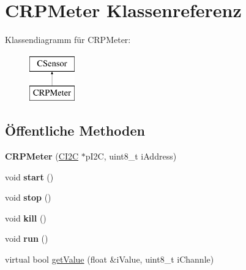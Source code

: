 \hypertarget{class_c_r_p_meter}{\section{\-C\-R\-P\-Meter \-Klassenreferenz}
\label{class_c_r_p_meter}
}
\-Klassendiagramm für \-C\-R\-P\-Meter\-:\begin{figure}[H]
\begin{center}
\leavevmode
\includegraphics[height=2.000000cm]{class_c_r_p_meter}
\end{center}
\end{figure}
\subsection*{Öffentliche \-Methoden}
\begin{DoxyCompactItemize}
\item 
\hypertarget{class_c_r_p_meter_ab0ce8f26cfa08edfe5f8b0810591eaca}{{\bfseries \-C\-R\-P\-Meter} (\hyperlink{class_c_i2_c}{\-C\-I2\-C} $\ast$p\-I2\-C, uint8\-\_\-t i\-Address)}\label{class_c_r_p_meter_ab0ce8f26cfa08edfe5f8b0810591eaca}

\item 
\hypertarget{class_c_r_p_meter_ae777168160c21ca61fcc2070bd691ef6}{void {\bfseries start} ()}\label{class_c_r_p_meter_ae777168160c21ca61fcc2070bd691ef6}

\item 
\hypertarget{class_c_r_p_meter_a2af8f07faa15457ab5440eed411065e5}{void {\bfseries stop} ()}\label{class_c_r_p_meter_a2af8f07faa15457ab5440eed411065e5}

\item 
\hypertarget{class_c_r_p_meter_a866096ac582ba8d3a743644dcfb25839}{void {\bfseries kill} ()}\label{class_c_r_p_meter_a866096ac582ba8d3a743644dcfb25839}

\item 
\hypertarget{class_c_r_p_meter_a54f8a5a721ce32a3557383429af33308}{void {\bfseries run} ()}\label{class_c_r_p_meter_a54f8a5a721ce32a3557383429af33308}

\item 
virtual bool \hyperlink{class_c_r_p_meter_af0c4786702d4abda2f61b0b0f9c968fa}{get\-Value} (float \&i\-Value, uint8\-\_\-t i\-Channle)
\end{DoxyCompactItemize}


